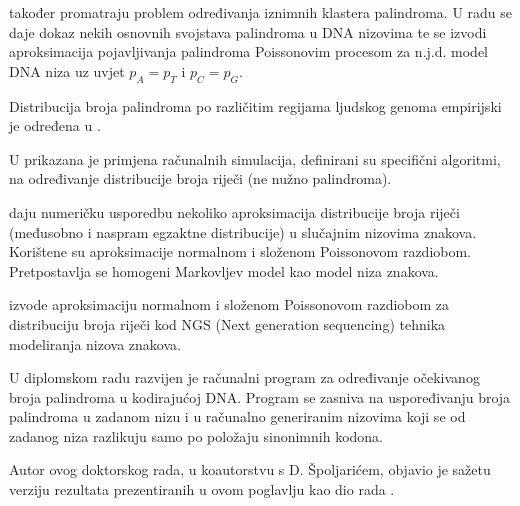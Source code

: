 \textcite{leung_nonrandom_2005} također promatraju problem određivanja
iznimnih klastera palindroma. U radu se daje dokaz nekih
osnovnih svojstava palindroma u DNA nizovima te
se izvodi aproksimacija pojavljivanja palindroma
Poissonovim procesom za n.j.d. model DNA niza
uz uvjet $p_A=p_T$ i $p_C = p_G$.

Distribucija broja palindroma po različitim regijama
ljudskog genoma empirijski je određena
u \textcite{lu_human_2007}.

U \textcite{chan_importance_2010} prikazana je primjena
računalnih simulacija, definirani su specifični algoritmi,
na određivanje distribucije broja riječi (ne nužno palindroma).

\textcite{robin_numerical_2001} daju numeričku usporedbu
nekoliko aproksimacija distribucije broja riječi
(međusobno i naspram egzaktne distribucije)
u slučajnim nizovima znakova.
Korištene su aproksimacije normalnom i 
složenom Poissonovom razdiobom.
Pretpostavlja se homogeni Markovljev model kao
model niza znakova.

\textcite{zhai_normal_2012} izvode aproksimaciju 
normalnom i složenom Poissonovom razdiobom 
za distribuciju broja riječi kod
NGS (Next generation sequencing) tehnika modeliranja
nizova znakova.

U diplomskom radu \textcite{gacesa_zastupljenost_2011} razvijen je računalni program
za određivanje očekivanog broja palindroma u kodirajućoj DNA. Program se zasniva
na uspoređivanju broja palindroma u zadanom nizu i u računalno generiranim 
nizovima koji se od zadanog niza razlikuju samo po položaju sinonimnih kodona.

Autor ovog doktorskog rada, u koautorstvu s D. Špoljarićem, 
objavio je sažetu verziju
rezultata prezentiranih u ovom poglavlju kao dio rada
\textcite{spoljaric_statistical_2013}.

